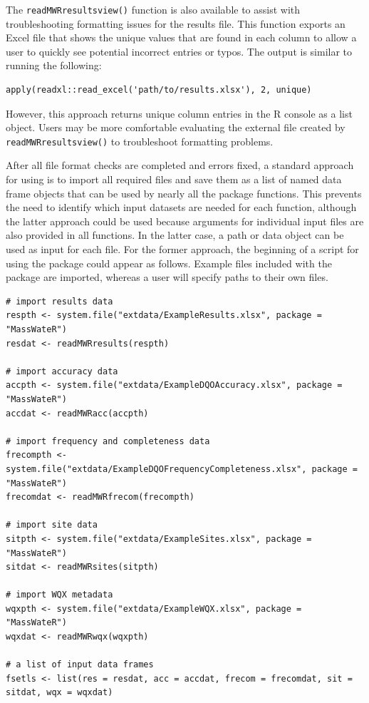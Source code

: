 The \texttt{readMWRresultsview()} function is also available to assist with troubleshooting formatting issues for the results file. This function exports an Excel file that shows the unique values that are found in each column to allow a user to quickly see potential incorrect entries or typos. The output is similar to running the following:

\begin{verbatim}
apply(readxl::read_excel('path/to/results.xlsx'), 2, unique)
\end{verbatim}

However, this approach returns unique column entries in the R console as a list object. Users may be more comfortable evaluating the external file created by \texttt{readMWRresultsview()} to troubleshoot formatting problems.

After all file format checks are completed and errors fixed, a standard approach for using  is to import all required files and save them as a list of named data frame objects that can be used by nearly all the package functions. This prevents the need to identify which input datasets are needed for each function, although the latter approach could be used because arguments for individual input files are also provided in all functions. In the latter case, a path or data object can be used as input for each file. For the former approach, the beginning of a script for using the package could appear as follows. Example files included with the package are imported, whereas a user will specify paths to their own files.

\begin{verbatim}
# import results data
respth <- system.file("extdata/ExampleResults.xlsx", package = "MassWateR")
resdat <- readMWRresults(respth)

# import accuracy data
accpth <- system.file("extdata/ExampleDQOAccuracy.xlsx", package = "MassWateR")
accdat <- readMWRacc(accpth)

# import frequency and completeness data
frecompth <- system.file("extdata/ExampleDQOFrequencyCompleteness.xlsx", package = "MassWateR")
frecomdat <- readMWRfrecom(frecompth)

# import site data
sitpth <- system.file("extdata/ExampleSites.xlsx", package = "MassWateR")
sitdat <- readMWRsites(sitpth)

# import WQX metadata
wqxpth <- system.file("extdata/ExampleWQX.xlsx", package = "MassWateR")
wqxdat <- readMWRwqx(wqxpth)

# a list of input data frames
fsetls <- list(res = resdat, acc = accdat, frecom = frecomdat, sit = sitdat, wqx = wqxdat)
\end{verbatim}

